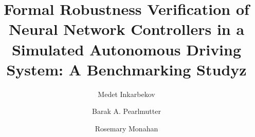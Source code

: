 \documentclass[runningheads]{llncs}
\begin{document}
\title{Formal Robustness Verification of Neural Network Controllers in a Simulated Autonomous Driving System: A Benchmarking Studyz}
\author{Medet Inkarbekov \and Barak A. Pearlmutter \and Rosemary Monahan} 


 
\maketitle 



   



%
%
% 

 
\printbibliography
\end{document}
